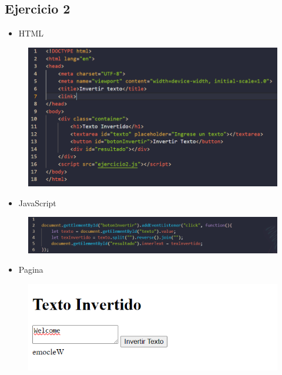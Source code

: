 \documentclass{article}
\begin{document}
	\subsection{Ejercicio 2}
	\begin{itemize}
		\item HTML
	\end{itemize}
	\begin{figure}[H]
		\centering
		\includegraphics[width=1.0\textwidth, keepaspectratio]{img/ejercicio2a}
	\end{figure}
	\begin{itemize}
		\item JavaScript
	\end{itemize}
	\begin{figure}[H]
		\centering
		\includegraphics[width=1.0\textwidth, keepaspectratio]{img/ejercicio2b}
	\end{figure}
	\begin{itemize}
		\item Pagina
	\end{itemize}
	\begin{figure}[H]
		\centering
		\includegraphics[width=1.0\textwidth, keepaspectratio]{img/ejercicio2c}
	\end{figure}
	
\end{document}
